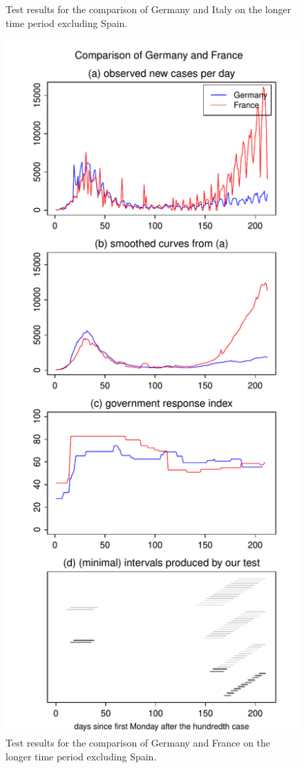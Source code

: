 \documentclass[a4paper,12pt]{article}
\numberwithin{equation}{section}
\begin{document}
\begin{figure}[h!]
\begin{minipage}[t]{0.49\textwidth}
\caption{Test results for the comparison of Germany and Italy on the longer time period excluding Spain.}\label{fig:supp3:first2}
\end{minipage}
\hspace{0.25cm}
\begin{minipage}[t]{0.49\textwidth}
\includegraphics[width=\textwidth]{plots/DEU_vs_FRA_four_countries}
\caption{Test results for the comparison of Germany and France on the longer time period excluding Spain.}
\end{minipage}
\end{figure}
\end{document}
